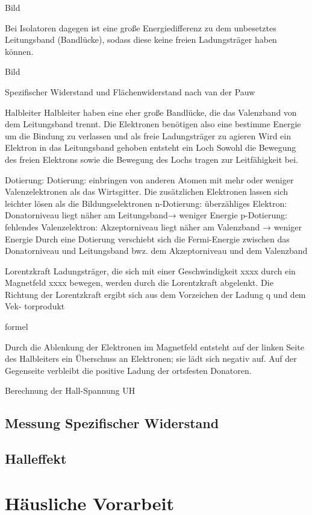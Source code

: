 \documentclass[a4paper]{scrartcl}
\numberwithin{equation}{subsection}
\begin{document}
Bild

Bei Isolatoren dagegen ist eine große Energiedifferenz zu dem unbesetztes Leitungsband (Bandlücke), sodass diese keine freien Ladungsträger haben können.

Bild

Spezifischer Widerstand und Flächenwiderstand nach van der Pauw


Halbleiter
Halbleiter haben eine eher große Bandlücke, die das Valenzband von dem Leitungsband trennt.
Die Elektronen benötigen also eine bestimme Energie um die Bindung zu verlassen und als freie Ladungsträger zu agieren
Wird ein Elektron in das Leitungsband gehoben entsteht ein Loch
Sowohl die Bewegung des freien Elektrons sowie die Bewegung des Lochs tragen zur Leitfähigkeit bei.

Dotierung:
Dotierung: einbringen von anderen Atomen mit mehr oder weniger Valenzelektronen als das Wirtsgitter.
Die zusätzlichen Elektronen lassen sich leichter lösen als die Bildungselektronen
n-Dotierung: überzähliges Elektron: Donatorniveau liegt näher am Leitungsband→ weniger Energie
p-Dotierung: fehlendes Valenzelektron: Akzeptorniveau liegt näher am Valenzband → weniger Energie
Durch eine Dotierung verschiebt sich die Fermi-Energie zwischen das Donatorniveau und Leitungsband bwz. dem Akzeptorniveau und dem Valenzband

Lorentzkraft
Ladungsträger, die sich mit einer Geschwindigkeit xxxx durch ein Magnetfeld xxxx bewegen, werden
durch die Lorentzkraft abgelenkt. 
Die Richtung der Lorentzkraft ergibt sich aus dem Vorzeichen der Ladung q und dem Vek-
torprodukt

formel

Durch die Ablenkung der Elektronen im Magnetfeld entsteht auf der linken Seite des Halbleiters
ein Überschuss an Elektronen; sie lädt sich negativ auf. Auf der Gegenseite verbleibt die positive
Ladung der ortsfesten Donatoren. 

Berechnung der Hall-Spannung UH 


\subsection{Messung Spezifischer Widerstand}

\subsection{Halleffekt}

\newpage

\section{Häusliche Vorarbeit}
\end{document}
